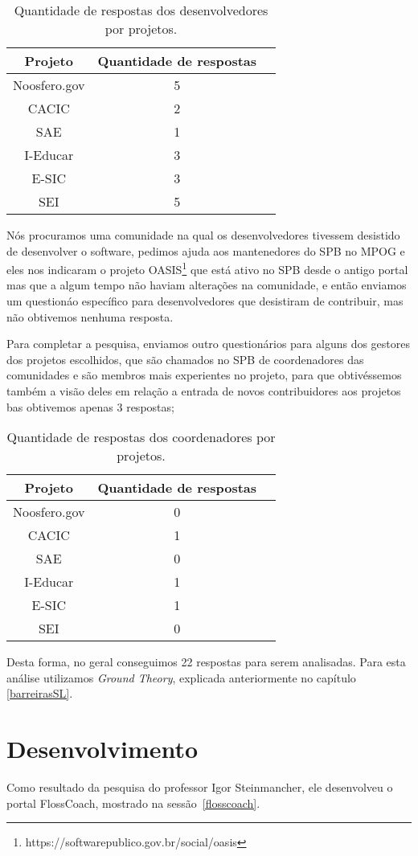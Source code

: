 \begin{table}[h]
	\centering
	\label{tab01}
	
	\begin{tabular}{ccc}
		\toprule
		\textbf{Projeto} & \textbf{Quantidade de respostas} \\
		\midrule
		Noosfero.gov & 5 \\
		CACIC & 2 \\
		SAE & 1 \\
		I-Educar & 3 \\
		E-SIC & 3 \\
		SEI & 5 \\
		\bottomrule
	\end{tabular}

	\caption{Quantidade de respostas dos desenvolvedores por projetos.}
\end{table}
  
Nós procuramos uma comunidade na qual os desenvolvedores tivessem desistido
de desenvolver o software, pedimos ajuda aos mantenedores do SPB no MPOG e eles nos 
indicaram o projeto OASIS\footnote{https://softwarepublico.gov.br/social/oasis} que 
está ativo no SPB desde o antigo portal mas que a algum tempo não haviam alterações
na comunidade, e então enviamos um questionáo específico para desenvolvedores
que desistiram de contribuir, mas não obtivemos nenhuma resposta. 

Para completar a pesquisa, enviamos outro questionários para alguns dos gestores dos
projetos escolhidos, que são chamados no SPB de coordenadores das comunidades e 
são membros mais experientes no projeto, para que obtivéssemos também a visão 
deles em relação a entrada de novos contribuidores aos projetos bas obtivemos 
apenas 3 respostas;

\begin{table}[h]
	\centering
	\label{tab01}
	
	\begin{tabular}{ccc}
		\toprule
		\textbf{Projeto} & \textbf{Quantidade de respostas} \\
		\midrule
		Noosfero.gov & 0 \\
		CACIC & 1 \\
		SAE & 0 \\
		I-Educar & 1 \\
		E-SIC & 1 \\
		SEI & 0 \\
		\bottomrule
	\end{tabular}

	\caption{Quantidade de respostas dos coordenadores por projetos.}
\end{table}

Desta forma, no geral conseguimos 22 respostas para serem analisadas. Para esta
análise utilizamos \textit{Ground Theory}, explicada anteriormente no capítulo
\ref{barreirasSL}.

\section{Desenvolvimento}

Como resultado da pesquisa do professor Igor Steinmancher, ele desenvolveu o 
portal FlossCoach, mostrado na sessão~\ref{flosscoach}.

